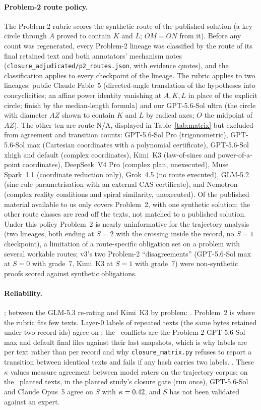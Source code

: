 \paragraph{Problem-2 route policy.} The Problem-2 rubric scores the synthetic route of the published solution (a key circle through $A$ proved to contain $K$ and $L$; $OM=ON$ from it). Before any count was regenerated, every Problem-2 lineage was classified by the route of its final retained text and both annotators' mechanism notes (\texttt{closure\_adjudicated/\allowbreak p2\_routes.json}, with evidence quotes), and the classification applies to every checkpoint of the lineage. The rubric applies to two lineages: public Claude Fable~5 (directed-angle translation of the hypotheses into concyclicities; an affine power identity vanishing at $A,K,L$ in place of the explicit circle; finish by the median-length formula) and our GPT-5.6-Sol ultra (the circle with diameter $AZ$ shown to contain $K$ and $L$ by radical axes; $O$ the midpoint of $AZ$). The other ten are route N/A, displayed in Table~\ref{tab:matrix} but excluded from agreement and transition counts: GPT-5.6-Sol Pro (trigonometric), GPT-5.6-Sol max (Cartesian coordinates with a polynomial certificate), GPT-5.6-Sol xhigh and default (complex coordinates), Kimi~K3 (law-of-sines and power-of-a-point coordinates), DeepSeek~V4 Pro (complex plan, unexecuted), Muse Spark~1.1 (coordinate reduction only), Grok~4.5 (no route executed), GLM-5.2 (sine-rule parametrisation with an external CAS certificate), and Nemotron (complex reality conditions and spiral similarity, unexecuted). Of the published material available to us only \citet{chen2026notes} covers Problem~2, with one synthetic solution; the other route classes are read off the texts, not matched to a published solution. Under this policy Problem~2 is nearly uninformative for the trajectory analysis (two lineages, both ending at $S{=}2$ with the crossing inside the record, no $S{=}1$ checkpoint), a limitation of a route-specific obligation set on a problem with several workable routes; v3's two Problem-2 ``disagreements'' (GPT-5.6-Sol max at $S{=}0$ with grade~7, Kimi~K3 at $S{=}1$ with grade~7) were non-synthetic proofs scored against synthetic obligations.

\paragraph{Reliability.} \KAPPATXT; between the GLM-5.3 re-rating and Kimi~K3 by problem: \RELTXT. Problem~2 is where the rubric fits few texts. Layer-0 labels of repeated texts (the same bytes retained under two record ids) agree on \REPEATEDCONSISTENT; the \REPEATEDCONFLICTS\ conflicts are the Problem-2 GPT-5.6-Sol max and default final files against their last snapshots, which is why labels are per text rather than per record and why \texttt{closure\_matrix.py} refuses to report a transition between identical texts and fails if any hash carries two labels. \ADJCHANGES. These $\kappa$ values measure agreement between model raters on the trajectory corpus; on the \CRNTexts\ planted texts, in the planted study's closure gate (run once), GPT-5.6-Sol and Claude Opus~5 agree on $S$ with $\kappa = 0.42$, and $S$ has not been validated against an expert.

